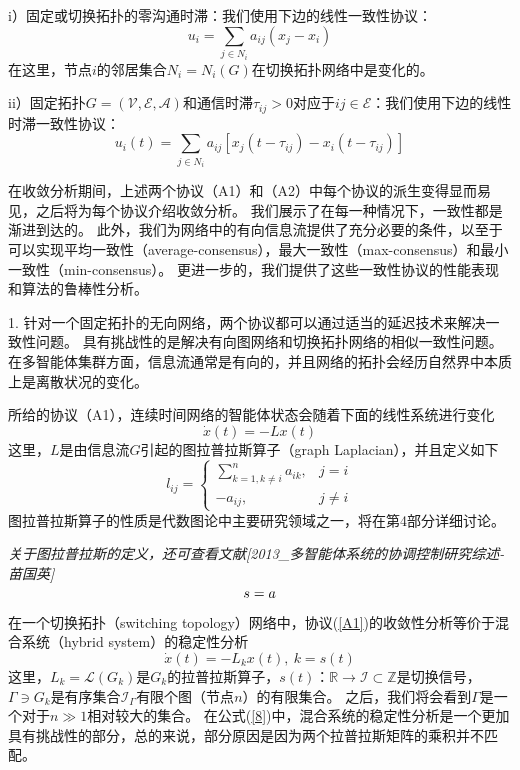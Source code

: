 \documentclass{article}
\begin{document}
i）固定或切换拓扑的零沟通时滞：我们使用下边的线性一致性协议：
\begin{equation}
    u_i = \sum_{j\in N_i}a_{ij}(x_j-x_i) \tag{A1} \label{A1}
\end{equation}
\indent 在这里，节点$i$的邻居集合$N_i=N_i(G)$在切换拓扑网络中是变化的。

ii）固定拓扑$G=(\mathcal{V}, \mathcal{E}, \mathcal{A})$和通信时滞$\tau_{ij}>0$对应于$ij\in \mathcal{E}$：我们使用下边的线性时滞一致性协议：
\begin{equation}
    u_i(t) = \sum_{j\in N_i}a_{ij}[x_j(t-\tau_{ij})-x_i(t-\tau_{ij})] \tag{A2}
\end{equation}

在收敛分析期间，上述两个协议（A1）和（A2）中每个协议的派生变得显而易见，之后将为每个协议介绍收敛分析。
我们展示了在每一种情况下，一致性都是渐进到达的。
此外，我们为网络中的有向信息流提供了充分必要的条件，以至于可以实现平均一致性（average-consensus），最大一致性（max-consensus）和最小一致性（min-consensus）。
更进一步的，我们提供了这些一致性协议的性能表现和算法的鲁棒性分析。

 1. 针对一个固定拓扑的无向网络，两个协议都可以通过适当的延迟技术来解决一致性问题。
具有挑战性的是解决有向图网络和切换拓扑网络的相似一致性问题。
在多智能体集群方面，信息流通常是有向的，并且网络的拓扑会经历自然界中本质上是离散状况的变化。

所给的协议（A1），连续时间网络的智能体状态会随着下面的线性系统进行变化
\begin{equation}
    \dot{x}(t) = -Lx(t)
\end{equation}
这里，$L$是由信息流$G$引起的图拉普拉斯算子（graph Laplacian），并且定义如下
\begin{equation}
l_{ij} = \left\{
    \begin{array}{ll}
        \sum_{k=1,k\ne i}^n a_{ik}, & j=i\\
        -a_{ij}, & j\ne i
    \end{array}\right.
    \label{7}
\end{equation}
图拉普拉斯算子的性质是代数图论中主要研究领域之一，将在第4部分详细讨论。

{\color[gray]{0.5} \em 
关于图拉普拉斯的定义，还可查看文献[2013\_多智能体系统的协调控制研究综述-苗国英]
\begin{equation}
    s=a \notag
\end{equation}
}

在一个切换拓扑（switching topology）网络中，协议(\ref{A1})的收敛性分析等价于混合系统（hybrid system）的稳定性分析
\begin{equation}
    \dot{x}(t) = -L_kx(t),\ k=s(t) \label{8}
\end{equation}
这里，$L_k = \mathcal{L}(G_k)$是$G_k$的拉普拉斯算子，$s(t)$：$\mathbb{R}\rightarrow \mathcal{I} \subset \mathbb{Z}$是切换信号，$\Gamma\ni G_k$是有序集合$\mathcal{I}_\Gamma$有限个图（节点$n$）的有限集合。
之后，我们将会看到$\Gamma$是一个对于$n\gg 1$相对较大的集合。
在公式(\ref{8})中，混合系统的稳定性分析是一个更加具有挑战性的部分，总的来说，部分原因是因为两个拉普拉斯矩阵的乘积并不匹配。
\end{document}
